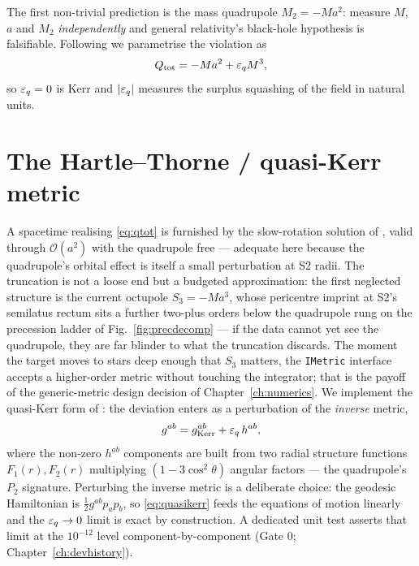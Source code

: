 The first non-trivial prediction is the mass quadrupole
$M_2 = -Ma^2$: measure $M$, $a$ and $M_2$ \emph{independently} and
general relativity's black-hole hypothesis is falsifiable. Following
\citet{Will2008} we parametrise the violation as
\begin{equation}
Q_{\rm tot} = -M a^2 + \varepsilon_q M^3,
\label{eq:qtot}
\end{equation}
so $\varepsilon_q = 0$ is Kerr and $|\varepsilon_q|$ measures the surplus squashing of
the field in natural units.

\section{The Hartle--Thorne / quasi-Kerr metric}
\label{sec:ht}

A spacetime realising \eqref{eq:qtot} is furnished by the slow-rotation
solution of \citet{HartleThorne1968}, valid through
$\mathcal{O}(a^2)$ with the quadrupole free — adequate here because the
quadrupole's orbital effect is itself a small perturbation at S2 radii.
The truncation is not a loose end but a budgeted approximation: the
first neglected structure is the current octupole $S_3 = -Ma^3$, whose
pericentre imprint at S2's semilatus rectum sits a further two-plus
orders below the quadrupole rung on the precession ladder of
Fig.~\ref{fig:precdecomp} — if the data cannot yet see the quadrupole,
they are far blinder to what the truncation discards. The moment the
target moves to stars deep enough that $S_3$ matters, the
\texttt{IMetric} interface accepts a higher-order metric without
touching the integrator; that is the payoff of the generic-metric
design decision of Chapter~\ref{ch:numerics}.
We implement the quasi-Kerr form of \citet{GlampedakisBabak2006}: the
deviation enters as a perturbation of the \emph{inverse} metric,
\begin{equation}
g^{ab} = g^{ab}_{\rm Kerr} + \varepsilon_q\, h^{ab},
\label{eq:quasikerr}
\end{equation}
where the non-zero $h^{ab}$ components are built from two radial
structure functions $F_1(r), F_2(r)$ multiplying
$(1 - 3\cos^2\theta)$ angular factors — the quadrupole's $P_2$
signature. Perturbing the inverse metric is a deliberate choice: the
geodesic Hamiltonian is $\tfrac12 g^{ab}p_a p_b$, so \eqref{eq:quasikerr}
feeds the equations of motion linearly and the $\varepsilon_q \to 0$ limit is
exact by construction. A dedicated unit test asserts that limit at the
$10^{-12}$ level component-by-component (Gate 0;
Chapter~\ref{ch:devhistory}).

